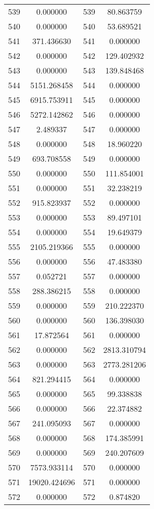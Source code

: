 \documentclass[12pt]{article}
\begin{document}
\begin{longtable}{@{}cccc@{}}
539 & 0.000000 & 539 & 80.863759 \\
540 & 0.000000 & 540 & 53.689521 \\
541 & 371.436630 & 541 & 0.000000 \\
542 & 0.000000 & 542 & 129.402932 \\
543 & 0.000000 & 543 & 139.848468 \\
544 & 5151.268458 & 544 & 0.000000 \\
545 & 6915.753911 & 545 & 0.000000 \\
546 & 5272.142862 & 546 & 0.000000 \\
547 & 2.489337 & 547 & 0.000000 \\
548 & 0.000000 & 548 & 18.960220 \\
549 & 693.708558 & 549 & 0.000000 \\
550 & 0.000000 & 550 & 111.854001 \\
551 & 0.000000 & 551 & 32.238219 \\
552 & 915.823937 & 552 & 0.000000 \\
553 & 0.000000 & 553 & 89.497101 \\
554 & 0.000000 & 554 & 19.649379 \\
555 & 2105.219366 & 555 & 0.000000 \\
556 & 0.000000 & 556 & 47.483380 \\
557 & 0.052721 & 557 & 0.000000 \\
558 & 288.386215 & 558 & 0.000000 \\
559 & 0.000000 & 559 & 210.222370 \\
560 & 0.000000 & 560 & 136.398030 \\
561 & 17.872564 & 561 & 0.000000 \\
562 & 0.000000 & 562 & 2813.310794 \\
563 & 0.000000 & 563 & 2773.281206 \\
564 & 821.294415 & 564 & 0.000000 \\
565 & 0.000000 & 565 & 99.338838 \\
566 & 0.000000 & 566 & 22.374882 \\
567 & 241.095093 & 567 & 0.000000 \\
568 & 0.000000 & 568 & 174.385991 \\
569 & 0.000000 & 569 & 240.207609 \\
570 & 7573.933114 & 570 & 0.000000 \\
571 & 19020.424696 & 571 & 0.000000 \\
572 & 0.000000 & 572 & 0.874820 \\

\end{longtable}
\end{document}
